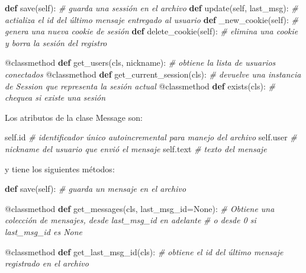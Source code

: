 \documentclass[12pt]{extarticle}
\newenvironment{Shaded}{}{}
\newcommand{\KeywordTok}[1]{\textcolor[rgb]{0.00,0.44,0.13}{\textbf{{#1}}}}
\newcommand{\CommentTok}[1]{\textcolor[rgb]{0.38,0.63,0.69}{\textit{{#1}}}}
\newcommand{\NormalTok}[1]{{#1}}
\newcommand{\VariableTok}[1]{\textcolor[rgb]{0.10,0.09,0.49}{{#1}}}
\newcommand{\OperatorTok}[1]{\textcolor[rgb]{0.40,0.40,0.40}{{#1}}}
\newcommand{\BuiltInTok}[1]{{#1}}
\newcommand{\AttributeTok}[1]{\textcolor[rgb]{0.49,0.56,0.16}{{#1}}}
\begin{document}
\begin{Shaded}
\begin{Highlighting}[]
\KeywordTok{def}\NormalTok{ save(}\VariableTok{self}\NormalTok{): }
\CommentTok{# guarda una sessión en el archivo}
\KeywordTok{def}\NormalTok{ update(}\VariableTok{self}\NormalTok{, last_msg): }
\CommentTok{# actializa el id del último mensaje entregado al usuario}
\KeywordTok{def}\NormalTok{ _new_cookie(}\VariableTok{self}\NormalTok{): }
\CommentTok{# genera una nueva cookie de sesión}
\KeywordTok{def}\NormalTok{ delete_cookie(}\VariableTok{self}\NormalTok{): }
\CommentTok{# elimina una cookie y borra la sesión del registro}
    
\AttributeTok{@classmethod}
\KeywordTok{def}\NormalTok{ get_users(cls, nickname): }
\CommentTok{# obtiene la lista de usuarios conectados}
\AttributeTok{@classmethod}
\KeywordTok{def}\NormalTok{ get_current_session(cls): }
\CommentTok{# devuelve una instancia de Session que representa la sesión actual}
\AttributeTok{@classmethod}
\KeywordTok{def}\NormalTok{ exists(cls): }
\CommentTok{# chequea si existe una sesión}
\end{Highlighting}
\end{Shaded}

Los atributos de la clase Message son:

\begin{Shaded}
\begin{Highlighting}[]
\VariableTok{self}\NormalTok{.}\BuiltInTok{id} \CommentTok{# identificador único autoincremental para manejo del archivo}
\VariableTok{self}\NormalTok{.user }\CommentTok{# nickname del usuario que envió el mensaje}
\VariableTok{self}\NormalTok{.text }\CommentTok{# texto del mensaje}
\end{Highlighting}
\end{Shaded}

y tiene los siguientes métodos:

\begin{Shaded}
\begin{Highlighting}[]
\KeywordTok{def}\NormalTok{ save(}\VariableTok{self}\NormalTok{):}
\CommentTok{# guarda un mensaje en el archivo}

\AttributeTok{@classmethod}
\KeywordTok{def}\NormalTok{ get_messages(cls, last_msg_id}\OperatorTok{=}\VariableTok{None}\NormalTok{):}
\CommentTok{# Obtiene una colección de mensajes, desde last_msg_id en adelante }
\CommentTok{# o desde 0 si last_msg_id es None}

\AttributeTok{@classmethod}
\KeywordTok{def}\NormalTok{ get_last_msg_id(cls):}
\CommentTok{# obtiene el id del último mensaje registrado en el archivo}
\end{Highlighting}
\end{Shaded}
\end{document}
